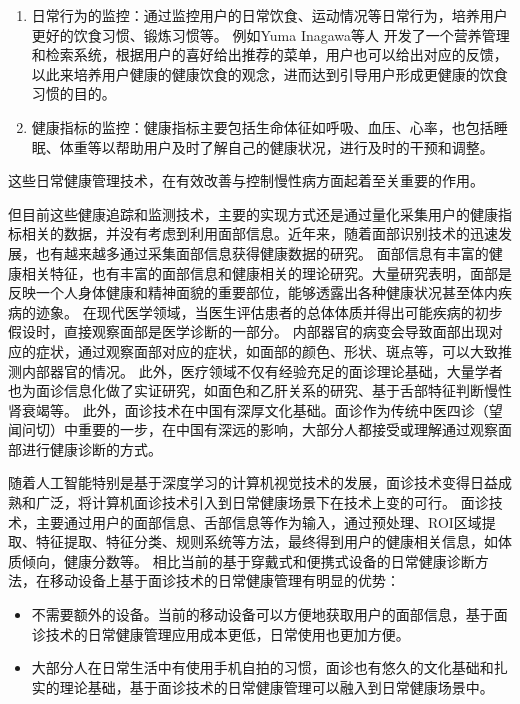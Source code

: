 \begin{enumerate}
    \item 日常行为的监控：通过监控用户的日常饮食、运动情况等日常行为，培养用户更好的饮食习惯、锻炼习惯等\cite{purpura2011fit4life,Inagawa2013A,cordeiro2015barriers, miller2014stepstream}。 例如Yuma Inagawa等人\cite{Inagawa2013A} 开发了一个营养管理和检索系统，根据用户的喜好给出推荐的菜单，用户也可以给出对应的反馈，以此来培养用户健康的健康饮食的观念，进而达到引导用户形成更健康的饮食习惯的目的。
    \item 健康指标的监控：健康指标主要包括生命体征如呼吸、血压、心率，也包括睡眠、体重等\cite{kay2012lullaby,gronvall2013beyond,walters2010a}以帮助用户及时了解自己的健康状况，进行及时的干预和调整。
\end{enumerate}

这些日常健康管理技术，在有效改善与控制慢性病方面起着至关重要的作用\cite{ayobi2017quantifying}。

但目前这些健康追踪和监测技术，主要的实现方式还是通过量化采集用户的健康指标相关的数据，并没有考虑到利用面部信息。近年来，随着面部识别技术的迅速发展，也有越来越多通过采集面部信息获得健康数据的研究。
面部信息有丰富的健康相关特征，也有丰富的面部信息和健康相关的理论研究。大量研究表明，面部是反映一个人身体健康和精神面貌的重要部位，能够透露出各种健康状况甚至体内疾病的迹象。
在现代医学领域，当医生评估患者的总体体质并得出可能疾病的初步假设时，直接观察面部是医学诊断的一部分\cite{ding2019reading}。
内部器官的病变会导致面部出现对应的症状，通过观察面部对应的症状，如面部的颜色、形状、斑点等，可以大致推测内部器官的情况\cite{汪珺2018六经辨证中自然辩证法三大规律初探}。
此外，医疗领域不仅有经验充足的面诊理论基础，大量学者也为面诊信息化做了实证研究，如面色和乙肝关系的研究\cite{吴秀艳2014108}、基于舌部特征判断慢性肾衰竭\cite{周小芳2018慢性肾衰患者虚兼湿浊证的口唇特征研究}等。
此外，面诊技术在中国有深厚文化基础。面诊作为传统中医四诊（望闻问切）中重要的一步，在中国有深远的影响，大部分人都接受或理解通过观察面部进行健康诊断的方式。


随着人工智能特别是基于深度学习的计算机视觉技术的发展，面诊技术变得日益成熟和广泛，将计算机面诊技术引入到日常健康场景下在技术上变的可行。
面诊技术，主要通过用户的面部信息、舌部信息等作为输入，通过预处理、ROI区域提取、特征提取、特征分类、规则系统等方法，最终得到用户的健康相关信息，如体质倾向，健康分数等\cite{林锋2019中医面诊系统调研报告}。
相比当前的基于穿戴式和便携式设备的日常健康诊断方法，在移动设备上基于面诊技术的日常健康管理有明显的优势：

\begin{itemize}
    \item 不需要额外的设备。当前的移动设备可以方便地获取用户的面部信息，基于面诊技术的日常健康管理应用成本更低，日常使用也更加方便。
    \item 大部分人在日常生活中有使用手机自拍的习惯，面诊也有悠久的文化基础和扎实的理论基础，基于面诊技术的日常健康管理可以融入到日常健康场景中。
\end{itemize}

